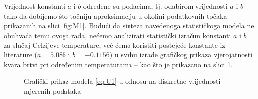 \documentclass[a4paper,12pt,oneside]{memoir}
\newcommand{\pgfmathparseFPU}[1]{\begingroup%
\pgfkeys{/pgf/fpu,/pgf/fpu/output format=fixed}%
\pgfmathparse{#1}%
\pgfmathsmuggle\pgfmathresult\endgroup}
\begin{document}
            Vrijednost konstanti $a$ i $b$ određene su podacima, tj. odabirom vrijednosti $a$ i $b$ tako da dobijemo što točniju aproksimaciju u okolini podatkovnih točaka prikazanih na slici \ref{fig:M1}. Budući da sinteza navedenoga statističkoga modela ne obuhvaća temu ovoga rada, nećemo analizirati statistički izračun konstanti $a$ i $b$ za slučaj Celzijeve temperature, već ćemo koristiti postejeće konstante iz literature ($a=5.085$ i $b=-0.1156$)\cite{Dekking} u svrhu izrade grafičkog prikaza vjerojatnosti kvara brtvi pri određenim temperaturama -- kao što je prikazano na slici \ref{fig:M2}.
            
            \begin{figure}[H]
                \centering
                \caption{Grafički prikaz modela \eqref{eq:U1} u odnosu na diskretne vrijednosti mjerenih podataka \cite{Dekking}}
                \label{fig:M2}
            \end{figure}
\end{document}
